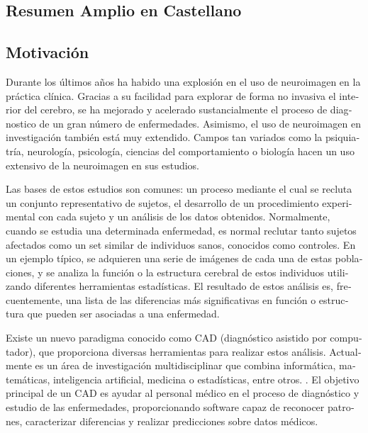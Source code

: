 \begingroup

\begin{otherlanguage}{spanish}
\chapter*{Resumen Amplio en Castellano}
\section*{Motivación}
Durante los últimos años ha habido una explosión en el uso de neuroimagen en la práctica clínica. Gracias a su facilidad para explorar de forma no invasiva el interior del cerebro, se ha mejorado y acelerado sustancialmente el proceso de diagnostico de un gran número de enfermedades. Asimismo, el uso de neuroimagen en investigación también está muy extendido. Campos tan variados como la psiquiatría, neurología, psicología, ciencias del comportamiento o biología hacen un uso extensivo de la neuroimagen en sus estudios. 

Las bases de estos estudios son comunes: un proceso mediante el cual se recluta un conjunto representativo de sujetos, el desarrollo de un procedimiento experimental con cada sujeto y un análisis de los datos obtenidos. Normalmente, cuando se estudia una determinada enfermedad, es normal reclutar tanto sujetos afectados como un set similar de individuos sanos, conocidos como controles. En un ejemplo típico, se adquieren una serie de imágenes de cada una de estas poblaciones, y se analiza la función o la estructura cerebral de estos individuos utilizando diferentes herramientas estadísticas. El resultado de estos análisis es, frecuentemente, una lista de las diferencias más significativas en función o estructura que pueden ser asociadas a una enfermedad. 

Existe un nuevo paradigma conocido como \acf{CAD} (diagnóstico asistido por computador), que proporciona diversas herramientas para realizar estos análisis. Actualmente es un área de investigación multidisciplinar que combina informática, matemáticas, inteligencia artificial, medicina o estadísticas, entre otros. \cite{Martinez-Murcia2016}. El objetivo principal de un \ac{CAD} es ayudar al personal médico en el proceso de diagnóstico y estudio de las enfermedades, proporcionando software capaz de reconocer patrones, caracterizar diferencias y realizar predicciones sobre datos médicos. 


\end{otherlanguage}
